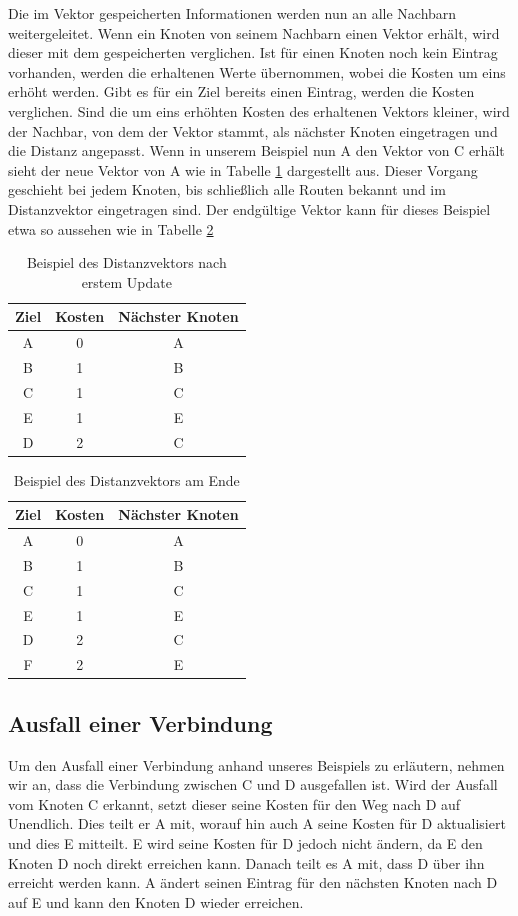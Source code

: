 Die im Vektor gespeicherten Informationen werden nun an alle Nachbarn weitergeleitet. Wenn ein Knoten von seinem Nachbarn einen Vektor erhält, wird dieser mit dem gespeicherten verglichen. Ist für einen Knoten noch kein Eintrag vorhanden, werden die erhaltenen Werte übernommen, wobei die Kosten um eins erhöht werden. Gibt es für ein Ziel bereits einen Eintrag, werden die Kosten verglichen. Sind die um eins erhöhten Kosten des erhaltenen Vektors kleiner, wird der Nachbar, von dem der Vektor stammt, als nächster Knoten eingetragen  und die Distanz angepasst. Wenn in unserem Beispiel nun A den Vektor von C erhält sieht der neue Vektor von A wie in Tabelle \ref{example_step_1} dargestellt aus. Dieser Vorgang geschieht bei jedem Knoten, bis schließlich alle Routen bekannt und im Distanzvektor eingetragen sind. Der endgültige Vektor kann für dieses Beispiel etwa so aussehen wie in Tabelle \ref{example_final}

\begin{table}
\caption{Beispiel des Distanzvektors nach erstem Update}
\label{example_step_1}
\centering
\begin{tabular}{| c | c | c |}
\hline
\textbf{Ziel} & \textbf{Kosten} & \textbf{Nächster Knoten} \\
\hline
A & 0 & A \\
\hline
B & 1 & B \\
\hline
C & 1 & C \\
\hline
E & 1 & E \\
\hline
D & 2 & C \\
\hline
\end{tabular}
\end{table}

\begin{table}
\caption{Beispiel des Distanzvektors am Ende}
\label{example_final}
\centering
\begin{tabular}{| c | c | c |}
\hline
\textbf{Ziel} & \textbf{Kosten} & \textbf{Nächster Knoten} \\
\hline
A & 0 & A \\
\hline
B & 1 & B \\
\hline
C & 1 & C \\
\hline
E & 1 & E \\
\hline
D & 2 & C \\
\hline
F & 2 & E \\
\hline
\end{tabular}
\end{table}

\subsection{Ausfall einer Verbindung}
Um den Ausfall einer Verbindung anhand unseres Beispiels zu erläutern, nehmen wir an, dass die Verbindung zwischen C und D ausgefallen ist. Wird der Ausfall vom Knoten C erkannt, setzt dieser seine Kosten für den Weg nach D auf Unendlich. Dies teilt er A mit, worauf hin auch A seine Kosten für D aktualisiert und dies E mitteilt. E wird seine Kosten für D jedoch nicht ändern, da E den Knoten D noch direkt erreichen kann. Danach teilt es A mit, dass D über ihn erreicht werden kann. A ändert seinen Eintrag für den nächsten Knoten nach D auf E und kann den Knoten D wieder erreichen.

